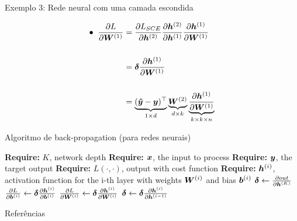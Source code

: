 \documentclass[10pt]{beamer}
\begin{document}
\begin{frame}{Exemplo 3: Rede neural com uma camada escondida}
\Large{

\begin{align*}
\bullet \; \; \frac{\partial L}{\partial \bm{W}^{(1)}}&= \frac{\partial L_{SCE}}{\partial \bm{h}^{(2)}}\frac{\partial \bm{h}^{(2)}}{\partial \bm{h}^{(1)}}\frac{\partial \bm{h}^{(1)}}{\partial \bm{W}^{(1)}}\\
&\\
&= \bm{\delta}\frac{\partial \bm{h}^{(1)}}{\partial \bm{W}^{(1)}}\\
&\\
&= \underbrace{(\bm{\hat{y}} - \bm{y})^{\top}}_{\tiny{1 \times d}} \underbrace{\bm{W}^{(2)}}_{\tiny{d \times k}} \underbrace{\frac{\partial \bm{h}^{(1)}}{\partial \bm{W}^{(1)}}}_{\tiny{k \times k \times n}}\\
\end{align*}
}
\end{frame}

\begin{frame}{Algoritmo de back-propagation (para redes neurais)}
\begin{algorithm}[H]
\begin{algorithmic}[1]
\STATE \textbf{Require:} $K$, network depth
\STATE \textbf{Require:} $\bm{x}$, the input to process
\STATE \textbf{Require:} $\bm{y}$, the target output
\STATE \textbf{Require:} $L( \cdot ,  \cdot)$, output with cost function
\STATE \textbf{Require:} $\bm{h}^{(i)}$, activation function for the i-th layer with weights $\bm{W}^{(i)}$ and bias $\bm{b}^{(i)}$
\STATE $\bm{\delta} \leftarrow \frac{\partial out}{\partial \bm{h}^{(K)}}$
\STATE $\frac{\partial L}{\partial \bm{b}^{(i)}} \leftarrow  \bm{\delta}\frac{\partial \bm{h}^{(i)}}{\partial \bm{b}^{(i)}}$
\STATE $\frac{\partial L}{\partial \bm{W}^{(i)}} \leftarrow  \bm{\delta}\frac{\partial \bm{h}^{(i)}}{\partial \bm{W}^{(i)}}$
\STATE $\bm{\delta} \leftarrow \bm{\delta}\frac{\partial \bm{h}^{(i)}}{\partial \bm{h}^{(i-1)}}$
\ENDFOR
\end{algorithmic}
\caption{Back-propagation for a deep neural network}
\label{alg:seq}
\end{algorithm}
\end{frame}


\begin{frame}[allowframebreaks]{Referências}

  
  

\end{frame}
\end{document}
